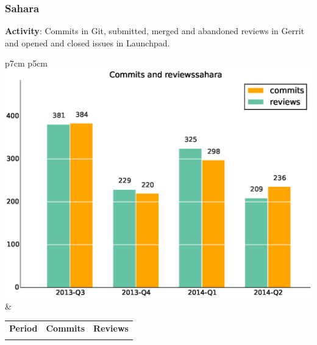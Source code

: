\documentclass[a4wide,11pt]{report}
\begin{document}
\newpage 
 \subsubsection{Sahara}

\textbf{Activity}: Commits in Git, submitted, merged and abandoned reviews in Gerrit and opened and closed issues in Launchpad.

\begin{tabular}{p{7cm} p{5cm}}
    \vspace{0pt} 
    \includegraphics[scale=.35]{figs/commitssahara.eps}
    & 
    \vspace{0pt}
    \begin{tabular}{l|r|r|}%
    \bfseries Period & \bfseries Commits & \bfseries Reviews %
    \csvreader[head to column names]{data/commitssahara.csv}{}%
    {\\ & \commits & \submitted}
    \end{tabular}
\end{tabular}
\end{document}
